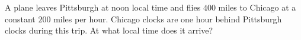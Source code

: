 A plane leaves Pittsburgh at noon local time and flies $400$ miles to Chicago at a constant $200$ miles per hour. Chicago clocks are one hour behind Pittsburgh clocks during this trip. At what local time does it arrive?
